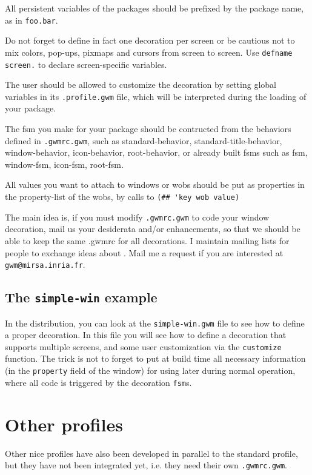 All persistent variables of the packages should be prefixed by the package
name, as in \verb"foo.bar".

Do not forget to define in fact one decoration per screen or be cautious not
to mix colors, pop-ups, pixmaps and cursors from screen to screen. Use 
\verb"defname screen." to declare screen-specific variables.

The user should be allowed to customize the decoration by setting global
variables in its \verb".profile.gwm" file, which will be interpreted during
the loading of your package.

The fsm you make for your package should be contructed from the behaviors
defined in \verb".gwmrc.gwm", such as standard-behavior,
standard-title-behavior, window-behavior, icon-behavior, root-behavior, or
already built fsms such as fsm, window-fsm, icon-fsm, root-fsm.

All values you want to attach to windows or wobs should be put as properties
in the property-list of the wobs, by calls to 
\verb"(## 'key wob value)"

The main idea is, if you must modify {\tt .gwmrc.gwm} to code your window
decoration, mail us your desiderata and/or enhancements, so that we should
be able to keep the same .gwmrc for all decorations.
I maintain mailing lists for people to exchange ideas about {\GWM}. Mail me
a request if you are interested at \verb"gwm@mirsa.inria.fr".

\subsection{The {\tt simple-win} example}

In the distribution, you can look at the \verb|simple-win.gwm| file to see how
to define a proper decoration. In this file you will see how to define a
decoration that supports multiple screens, and some user customization via the
\verb|customize| function. The trick is not to forget to put at build time all
necessary information (in the \verb|property| field of the window) for using
later during normal operation, where all code is triggered by the decoration
\verb|fsm|s.

\section{Other profiles}

Other nice profiles have also been developed in parallel to the standard
profile, but they have not been integrated yet, i.e. they need their own
{\tt .gwmrc.gwm}.

